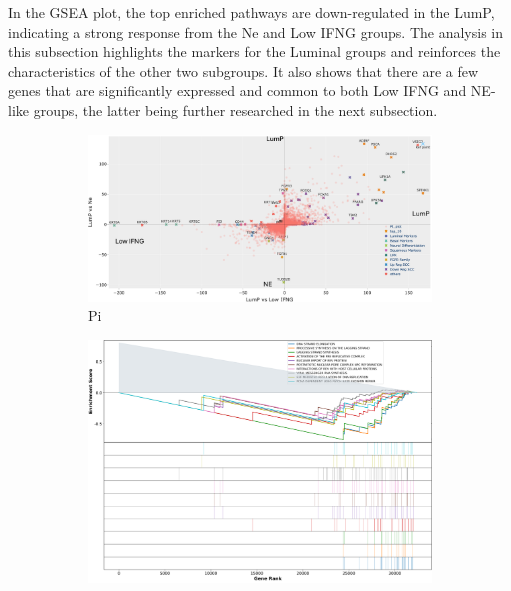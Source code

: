 In the GSEA plot, the top enriched pathways are down-regulated in the LumP, indicating a strong response from the Ne and Low IFNG groups. The analysis in this subsection highlights the markers for the Luminal groups and reinforces the characteristics of the other two subgroups. It also shows that there are a few genes that are significantly expressed and common to both Low IFNG and NE-like groups, the latter being further researched in the next subsection.

\begin{figure}[H]
    \centering
    \small
    \begin{subfigure}[!t]{1.0\textwidth}
        \includegraphics[width=\textwidth,keepaspectratio]{Sections/ClusteringAnalysis/Resources/discussion/other_groups/lump_pi.png}    
        \caption{Pi}
        \label{fig:cs:lumP_pi}
    \end{subfigure}
    \centering
    \begin{subfigure}[!t]{0.83\textwidth}
        \includegraphics[width=\textwidth, keepaspectratio]{Sections/ClusteringAnalysis/Resources/discussion/other_groups/lumP2_reactome_10_top.png}

\end{subfigure}
\end{figure}
